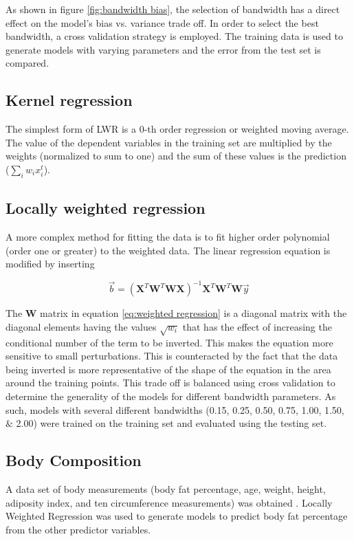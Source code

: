 \documentclass{IEEEtran}
\begin{document}
As shown in figure \ref{fig:bandwidth bias}, the selection of bandwidth has a direct effect on the model's bias vs. variance trade off. In order to select the best bandwidth, a cross validation strategy is employed. The training data is used to generate models with varying parameters and the error from the test set is compared.

\subsection{Kernel regression}

The simplest form of LWR is a 0-th order regression or weighted moving average. The value of the dependent variables in the training set are multiplied by the weights (normalized to sum to one) and the sum of these values is the prediction ($\sum_i w_i x^t_i$). 

\subsection{Locally weighted regression}

A more complex method for fitting the data is to fit higher order polynomial (order one or greater) to the weighted data. The linear regression equation is modified by inserting 

\begin{equation}
\vec{b} = (\mathbf{X}^T  \mathbf{W}^T  \mathbf{W}  \mathbf{X})^{-1} \mathbf{X}^T \mathbf{W}^T \mathbf{W} \vec{y}
\label{eq:weighted regression}
\end{equation}

The $\mathbf{W}$ matrix in equation \ref{eq:weighted regression} is a diagonal matrix with the diagonal elements having the values $\sqrt{w_i}$ that has the effect of increasing the conditional number of the term to be inverted. This makes the equation more sensitive to small perturbations. This is counteracted by the fact that the data being inverted is more representative of the shape of the equation in the area around the training points. This trade off is balanced using cross validation to determine the generality of the models for different bandwidth parameters. As such, models with several different bandwidths (\numlist{0.15; 0.25; 0.50; 0.75; 1.00; 1.50; 2.00}) were trained on the training set and evaluated using the testing set.

\subsection{Body Composition}
A data set of body measurements (body fat percentage, age, weight, height, adiposity index, and ten 
circumference measurements) was obtained \cite{Penrose1985}. Locally Weighted Regression was used to generate models to 
predict body fat percentage from the other predictor variables.
\end{document}
